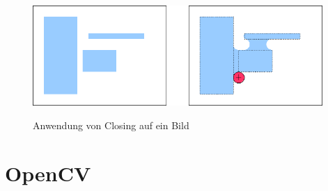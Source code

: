 \begin{figure}[ht]
   \centering
     \includegraphics[width=11cm]{Bilder/MorphologicalClosing} \\
 \caption{Anwendung von Closing auf ein Bild}
 \label{fig:Closing}
\end{figure}

\section{OpenCV} %

